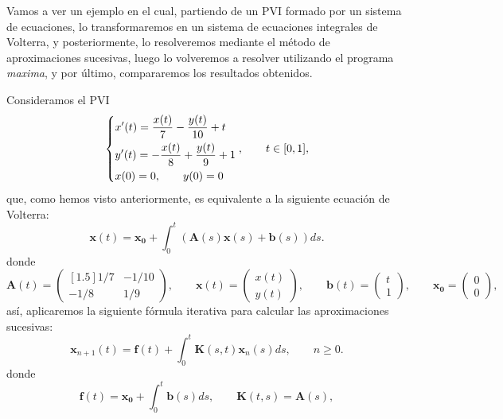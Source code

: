 Vamos a ver un ejemplo en el cual, partiendo de un PVI formado por un sistema de ecuaciones, lo transformaremos en un sistema de ecuaciones integrales de Volterra, y posteriormente, lo resolveremos mediante el método de aproximaciones sucesivas, luego lo volveremos a resolver utilizando el programa \textit{maxima}, y por último, compararemos los resultados obtenidos.

\begin{ejemplo}
	Consideramos el PVI
	\begin{equation}
		\begin{dcases} x'(t) = \dfrac{x(t)}{7}-\dfrac{y(t)}{10} + t \\ y'(t) = -\dfrac{x(t)}{8} +\dfrac{y(t)}{9} +1 \\ x(0) = 0, \qquad y(0) = 0 \end{dcases}, \qquad t \in [0,1],
	\end{equation}
	que, como hemos visto anteriormente, es equivalente a la siguiente ecuación de Volterra:
	\begin{equation}
		\textbf{x}(t)= \textbf{x}_\textbf{0} + \int_0^t (\textbf{A}(s)\textbf{x}(s)+\textbf{b}(s))ds.
	\end{equation}
	donde
	\begin{equation}
		\textbf{A}(t) = \begin{pmatrix}[1.5]
			1/7 & -1/10 \\ 
			-1/8 & 1/9
		\end{pmatrix}, \qquad \textbf{x}(t) = \begin{pmatrix}
			x(t) \\ y(t)
		\end{pmatrix}, \qquad \textbf{b}(t) = \begin{pmatrix}
			t \\ 1
		\end{pmatrix}, \qquad \textbf{x}_\textbf{0} = \begin{pmatrix}
		0 \\ 0
		\end{pmatrix},
	\end{equation}
	así, aplicaremos la siguiente fórmula iterativa para calcular las aproximaciones sucesivas:
	\begin{equation}
		\textbf{x}_{n+1}(t) = \textbf{f}(t) + \int_0^t \textbf{K}(s,t)\textbf{x}_n(s)ds, \qquad n \geqslant 0.
	\end{equation}
	donde
	\begin{equation}
		\textbf{f}(t) = \textbf{x}_\textbf{0} + \int_0^t \textbf{b}(s)ds, \qquad \textbf{K}(t,s) = \textbf{A}(s),

\end{equation}
\end{ejemplo}
